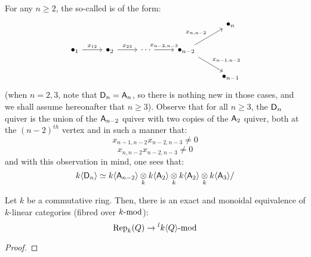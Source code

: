             \begin{example}
                For any $n \geq 2$, the so-called  is of the form:
                    $$
                        \begin{tikzcd}
                        	&&&& {\bullet_n} \\
                        	{\bullet_1} & {\bullet_2} & \cdots & {\bullet_{n - 2}} \\
                        	&&&& {\bullet_{n - 1}}
                        	\arrow["{x_{12}}", from=2-1, to=2-2]
                        	\arrow["{x_{23}}", from=2-2, to=2-3]
                        	\arrow["{x_{n - 2, n - 3}}", from=2-3, to=2-4]
                        	\arrow["{x_{n, n - 2}}", from=2-4, to=1-5]
                        	\arrow["{x_{n - 1, n - 2}}", from=2-4, to=3-5]
                        \end{tikzcd}
                    $$
                (when $n = 2, 3$, note that $\sfD_n = \sfA_n$, so there is nothing new in those cases, and we shall assume hereonafter that $n \geq 3$). Observe that for all $n \geq 3$, the $\sfD_n$ quiver is the union of the $\sfA_{n - 2}$ quiver with two copies of the $\sfA_2$ quiver, both at the $(n - 2)^{th}$ vertex and in such a manner that:
                    $$x_{n - 1, n - 2} x_{n - 2, n - 3} \not = 0$$
                    $$x_{n, n - 2} x_{n - 2, n - 3} \not = 0$$
                and with this observation in mind, one sees that:
                    $$k\<\sfD_n\> \cong k\<\sfA_{n - 2}\> \tensor_k k\<\sfA_2\> \tensor_k k\<\sfA_2\> \tensor_k k\<\sfA_3\>/$$
            \end{example}
            \begin{example}
                
            \end{example}
            \begin{proposition} \label{prop: quiver_representations_are_modules_over_quiver_algebras}
                Let $k$ be a commutative ring. Then, there is an exact and monoidal equivalence of $k$-linear categories (fibred over $k\mod$):
                    $$\Rep_{k}(Q) \to {}^lk\<Q\>\mod$$
            \end{proposition}
                \begin{proof}
                    
                \end{proof}
